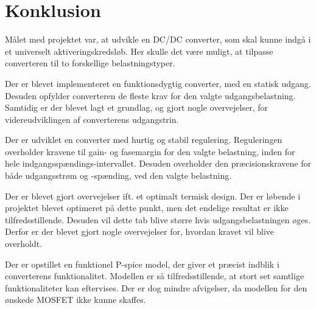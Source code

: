 
\chapter{Konklusion}
Målet med projektet var, at udvikle en DC/DC converter, som skal kunne indgå i et universelt aktiveringskredsløb. Her skulle det være muligt, at tilpasse converteren til to forskellige belastningstyper. 

Der er blevet implementeret en funktionsdygtig converter, med en statisk udgang. Desuden opfylder converteren de fleste krav for den valgte udgangsbelastning. Samtidig er der blevet lagt et grundlag, og gjort nogle overvejelser, for videreudviklingen af converterens udgangstrin. 

Der er udviklet en converter med hurtig og stabil regulering. Reguleringen overholder kravene til gain- og fasemargin for den valgte belastning, inden for hele indgangsspændings-intervallet. Desuden overholder den præcisionskravene for både udgangsstrøm og -spænding, ved den valgte belastning. 

Der er blevet gjort overvejelser ift. et optimalt termisk design. Der er løbende i projektet blevet optimeret på dette punkt, men det endelige resultat er ikke tilfredsstillende. Desuden vil dette tab blive større hvis udgangsbelastningen øges. Derfor er der blevet gjort nogle overvejelser for, hvordan kravet vil blive overholdt. 

Der er opstillet en funktionel P-spice model, der giver et præcist indblik i converterens funktionalitet. Modellen er så tilfredsstillende, at stort set samtlige funktionaliteter kan eftervises. Der er dog mindre afvigelser, da modellen for den ønskede MOSFET ikke kunne skaffes.

